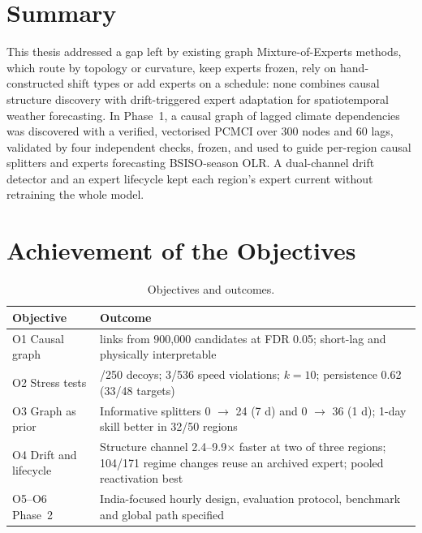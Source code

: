 \label{chap:conclusion}

\section{Summary}
\label{sec:conc-summary}

This thesis addressed a gap left by existing graph Mixture-of-Experts methods, which route by topology or curvature, keep experts frozen, rely on hand-constructed shift types or add experts on a schedule: none combines causal structure discovery with drift-triggered expert adaptation for spatiotemporal weather forecasting. In Phase~1, a causal graph of lagged climate dependencies was discovered with a verified, vectorised PCMCI over 300 nodes and 60 lags, validated by four independent checks, frozen, and used to guide per-region causal splitters and experts forecasting BSISO-season OLR. A dual-channel drift detector and an expert lifecycle kept each region's expert current without retraining the whole model.

\section{Achievement of the Objectives}
\label{sec:conc-objectives}

\begin{table}[htbp]
\centering
\caption{Objectives and outcomes.}
\label{tab:objectives}
\footnotesize
\renewcommand{\arraystretch}{1.2}
\begin{tabularx}{\textwidth}{>{\raggedright\arraybackslash}p{3.0cm}>{\raggedright\arraybackslash}X}
\toprule
\textbf{Objective} & \textbf{Outcome} \\
\midrule
O1 Causal graph & 536 links from 900{,}000 candidates at FDR 0.05; short-lag and physically interpretable \\
O2 Stress tests & 0/250 decoys; 3/536 speed violations; $k=10$; persistence 0.62 (33/48 targets) \\
O3 Graph as prior & Informative splitters 0 $\to$ 24 (7 d) and 0 $\to$ 36 (1 d); 1-day skill better in 32/50 regions \\
O4 Drift and lifecycle & Structure channel 2.4--9.9$\times$ faster at two of three regions; 104/171 regime changes reuse an archived expert; pooled reactivation best \\
O5--O6 Phase~2 & India-focused hourly design, evaluation protocol, benchmark and global path specified \\
\bottomrule
\end{tabularx}
\end{table}

